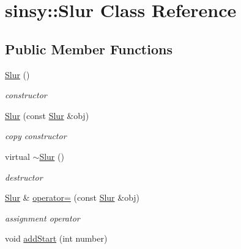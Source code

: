 \hypertarget{classsinsy_1_1Slur}{\section{sinsy\-:\-:\-Slur \-Class \-Reference}
\label{classsinsy_1_1Slur}
}
\subsection*{\-Public \-Member \-Functions}
\begin{DoxyCompactItemize}
\item 
\hypertarget{classsinsy_1_1Slur_aba0fcae139a72d06ecfafa10f41e672b}{\hyperlink{classsinsy_1_1Slur_aba0fcae139a72d06ecfafa10f41e672b}{\-Slur} ()}\label{classsinsy_1_1Slur_aba0fcae139a72d06ecfafa10f41e672b}

\begin{DoxyCompactList}\small\item\em constructor \end{DoxyCompactList}\item 
\hypertarget{classsinsy_1_1Slur_a3afc452caaf08653f482f590c754dc17}{\hyperlink{classsinsy_1_1Slur_a3afc452caaf08653f482f590c754dc17}{\-Slur} (const \hyperlink{classsinsy_1_1Slur}{\-Slur} \&obj)}\label{classsinsy_1_1Slur_a3afc452caaf08653f482f590c754dc17}

\begin{DoxyCompactList}\small\item\em copy constructor \end{DoxyCompactList}\item 
\hypertarget{classsinsy_1_1Slur_a3db24c2ec21ab6bd61913b0738d53fb7}{virtual \hyperlink{classsinsy_1_1Slur_a3db24c2ec21ab6bd61913b0738d53fb7}{$\sim$\-Slur} ()}\label{classsinsy_1_1Slur_a3db24c2ec21ab6bd61913b0738d53fb7}

\begin{DoxyCompactList}\small\item\em destructor \end{DoxyCompactList}\item 
\hypertarget{classsinsy_1_1Slur_a97b57041baff294fddef94bf75d04ee6}{\hyperlink{classsinsy_1_1Slur}{\-Slur} \& \hyperlink{classsinsy_1_1Slur_a97b57041baff294fddef94bf75d04ee6}{operator=} (const \hyperlink{classsinsy_1_1Slur}{\-Slur} \&obj)}\label{classsinsy_1_1Slur_a97b57041baff294fddef94bf75d04ee6}

\begin{DoxyCompactList}\small\item\em assignment operator \end{DoxyCompactList}\item 
\hypertarget{classsinsy_1_1Slur_a9a0abb5593bae4c3956d9be7af643d29}{void \hyperlink{classsinsy_1_1Slur_a9a0abb5593bae4c3956d9be7af643d29}{add\-Start} (int number)}\label{classsinsy_1_1Slur_a9a0abb5593bae4c3956d9be7af643d29}


\end{DoxyCompactItemize}
